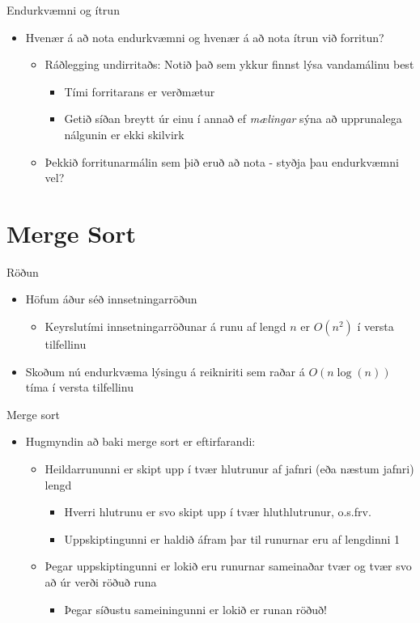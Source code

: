 \documentclass{beamer}
\begin{document}
\begin{frame}{Endurkvæmni og ítrun}
\begin{itemize}
 \item Hvenær á að nota endurkvæmni og hvenær á að nota ítrun við forritun? \pause
 \begin{itemize}
  \item Ráðlegging undirritaðs: Notið það sem ykkur finnst lýsa vandamálinu best
  \begin{itemize}
   \item Tími forritarans er verðmætur
   \item Getið síðan breytt úr einu í annað ef \emph{mælingar} sýna að upprunalega nálgunin er ekki skilvirk
  \end{itemize}
  \item Þekkið forritunarmálin sem þið eruð að nota - styðja þau endurkvæmni vel?
 \end{itemize}
\end{itemize}
\end{frame}

\section{Merge Sort}

\begin{frame}{Röðun}
\begin{itemize}
 \item Höfum áður séð innsetningarröðun
 \begin{itemize}
  \item Keyrslutími innsetningarröðunar á runu af lengd $n$ er $O(n^2)$ í versta tilfellinu
 \end{itemize}
 \item Skoðum nú endurkvæma lýsingu á reikniriti sem raðar á $O(n\log(n))$ tíma í versta tilfellinu
\end{itemize}
\end{frame}

\begin{frame}{Merge sort}
\begin{itemize}
 \item Hugmyndin að baki merge sort er eftirfarandi:
 \begin{itemize}
  \item Heildarrununni er skipt upp í tvær hlutrunur af jafnri (eða næstum jafnri) lengd
  \begin{itemize}
   \item Hverri hlutrunu er svo skipt upp í tvær hluthlutrunur, o.s.frv.
   \item Uppskiptingunni er haldið áfram þar til runurnar eru af lengdinni 1
  \end{itemize}
  \item Þegar uppskiptingunni er lokið eru runurnar sameinaðar tvær og tvær svo að úr verði röðuð runa
  \begin{itemize}
   \item Þegar síðustu sameiningunni er lokið er runan röðuð!
  \end{itemize}
 \end{itemize}
\end{itemize}
\end{frame}
\end{document}
